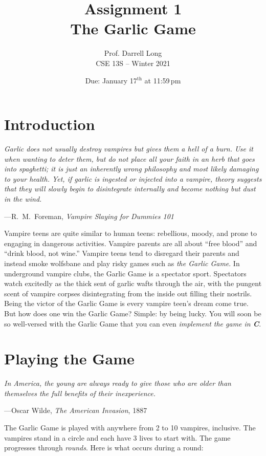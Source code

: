 \documentclass[11pt]{article}
\title{Assignment 1 \\ The Garlic Game}
\author{Prof. Darrell Long \\ CSE 13S -- Winter 2021}
\date{Due: January 17$^\text{th}$ at 11:59\,pm}
\begin{document}
\maketitle

\section{Introduction}

\epigraph{\emph{Garlic does not usually destroy vampires but gives them a hell
of a burn. Use it when wanting to deter them, but do not place all your faith in
an herb that goes into spaghetti; it is just an inherently wrong philosophy and
most likely damaging to your health. Yet, if garlic is ingested or injected into
a vampire, theory suggests that they will slowly begin to disintegrate
internally and become nothing but dust in the wind.}}{---R.\ M.\ Foreman,
\emph{Vampire Slaying for Dummies 101}}

Vampire teens are quite similar to human teens: rebellious, moody, and prone to
engaging in dangerous activities. Vampire parents are all about ``free blood''
and ``drink blood, not wine.'' Vampire teens tend to disregard their parents and
instead smoke wolfsbane and play risky games such as \emph{the Garlic Game}. In
underground vampire clubs, the Garlic Game is a spectator sport. Spectators watch
excitedly as the thick sent of garlic wafts through the air, with the pungent
scent of vampire corpses disintegrating from the inside out filling their
nostrils. Being the victor of the Garlic Game is every vampire teen's dream come
true. But how does one win the Garlic Game? Simple: by being lucky. You will
soon be so well-versed with the Garlic Game that you can even \emph{implement
the game in \textbf{C}}.


\section{Playing the Game}

\textwidth
\epigraph{\emph{In America, the young are always ready to give those who are
older than themselves the full benefits of their inexperience.}}{---Oscar Wilde,
\emph{The American Invasion}, 1887}

The Garlic Game is played with anywhere from 2 to 10 vampires, inclusive. The
vampires stand in a circle and each have 3 lives to start with. The game
progresses through \emph{rounds}. Here is what occurs during a round:
\end{document}
